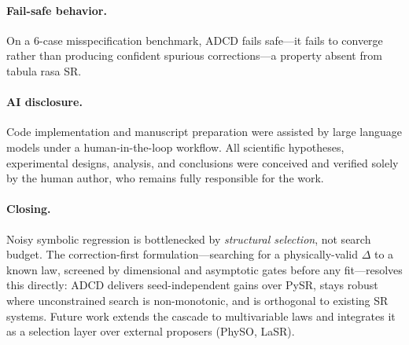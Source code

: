 \documentclass{article}
\begin{document}
\paragraph{Fail-safe behavior.}
On a 6-case misspecification benchmark, ADCD fails safe---it fails to converge rather than producing confident spurious corrections---a property absent from tabula rasa SR.

\paragraph{AI disclosure.} Code implementation and manuscript preparation were assisted by large language models under a human-in-the-loop workflow. All scientific hypotheses, experimental designs, analysis, and conclusions were conceived and verified solely by the human author, who remains fully responsible for the work.

\paragraph{Closing.}
Noisy symbolic regression is bottlenecked by \emph{structural selection}, not search budget. The correction-first formulation---searching for a physically-valid $\Delta$ to a known law, screened by dimensional and asymptotic gates before any fit---resolves this directly: ADCD delivers seed-independent gains over PySR, stays robust where unconstrained search is non-monotonic, and is orthogonal to existing SR systems. Future work extends the cascade to multivariable laws and integrates it as a selection layer over external proposers (PhySO, LaSR).
\end{document}
